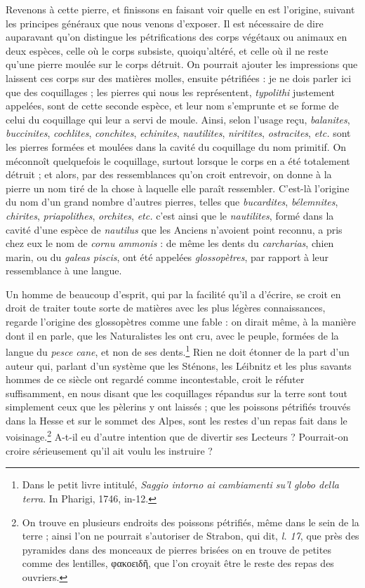 \documentclass[a4paper, 11pt, oneside, polutonikogreek, french]{article}
\begin{document}
Revenons à cette pierre, et finissons en faisant voir quelle en est l'origine, suivant les principes généraux que nous venons d'exposer. Il est nécessaire de dire auparavant qu'on distingue les pétrifications des corps végétaux ou animaux en deux espèces, celle où le corps subsiste, quoiqu'altéré, et celle où il ne reste qu'une pierre moulée sur le corps détruit. On pourrait ajouter les impressions que laissent ces corps sur des matières molles, ensuite pétrifiées : je ne dois parler ici que des coquillages ; les pierres qui nous les représentent, \emph{typolithi} justement appelées, sont de cette seconde espèce, et leur nom s'emprunte et se forme de celui du coquillage qui leur a servi de moule. Ainsi, selon l'usage reçu, \emph{balanites}, \emph{buccinites}, \emph{cochlites}, \emph{conchites}, \emph{echinites}, \emph{nautilites}, \emph{niritites}, \emph{ostracites}, \emph{etc.} sont les pierres formées et moulées dans la cavité du coquillage du nom primitif. On méconnoît quelquefois le coquillage, surtout lorsque le corps en a été totalement détruit ; et alors, par des ressemblances qu'on croit entrevoir, on donne à la pierre un nom tiré de la chose à laquelle elle paraît ressembler. C'est-là l'origine du nom d'un grand nombre d'autres pierres, telles que \emph{bucardites}, \emph{bélemnites}, \emph{chirites}, \emph{priapolithes}, \emph{orchites}, \emph{etc.} c'est ainsi que le \emph{nautilites}, formé dans la cavité d'une espèce de \emph{nautilus} que les Anciens n'avoient point reconnu, a pris chez eux le nom de \emph{cornu ammonis} : de même les dents du \emph{carcharias}, chien marin, ou du \emph{galeas piscis}, ont été appelées \emph{glossopètres}, par rapport à leur ressemblance à une langue.

Un homme de beaucoup d'esprit, qui par la facilité qu'il a d'écrire, se croit en droit de traiter toute sorte de matières avec les plus légères connaissances, regarde l'origine des glossopètres comme une fable : on dirait même, à la manière dont il en parle, que les Naturalistes les ont cru, avec le peuple, formées de la langue du \emph{pesce cane}, et non de ses dents.\footnote{Dans le petit livre intitulé, \emph{Saggio intorno ai cambiamenti su'l globo della terra}. In Pharigi, 1746, in-12.} Rien ne doit étonner de la part d'un auteur qui, parlant d'un système que les Sténons, les Léibnitz et les plus savants hommes de ce siècle ont regardé comme incontestable, croit le réfuter suffisamment, en nous disant que les coquillages répandus sur la terre sont tout simplement ceux que les pèlerins y ont laissés ; que les poissons pétrifiés trouvés dans la Hesse et sur le sommet des Alpes, sont les restes d'un repas fait dans le voisinage.\footnote{On trouve en plusieurs endroits des poissons pétrifiés, même dans le sein de la terre ; ainsi l'on ne pourrait s'autoriser de Strabon, qui dit, \emph{l. 17}, que près des pyramides dans des monceaux de pierres brisées on en trouve de petites comme des lentilles, φακοειδῆ, que l'on croyait être le reste des repas des ouvriers.} A-t-il eu d'autre intention que de divertir ses Lecteurs ? Pourrait-on croire sérieusement qu'il ait voulu les instruire ?
\end{document}
